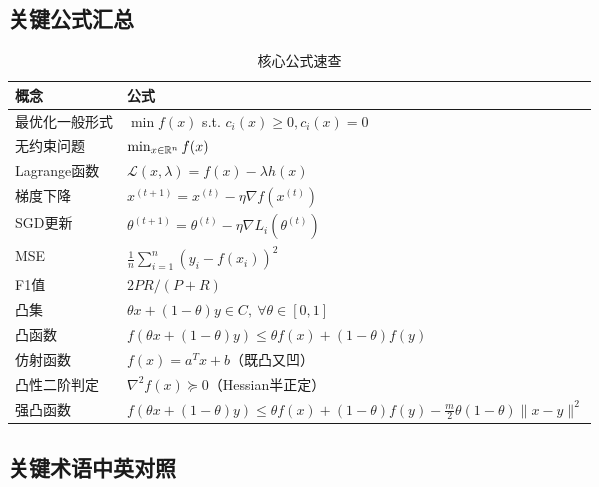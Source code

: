 \subsection{关键公式汇总}

\begin{table}[htbp]
\centering
\caption{核心公式速查}
\begin{tabular}{@{}ll@{}}
\toprule
\textbf{概念} & \textbf{公式} \\
\midrule
最优化一般形式 & $\min f(x)$ s.t. $c_i(x) \geq 0, c_i(x) = 0$ \\
无约束问题 & $\min_{x \in \mathbb{R}^n} f(x)$ \\
Lagrange函数 & $\mathcal{L}(x, \lambda) = f(x) - \lambda h(x)$ \\
梯度下降 & $x^{(t+1)} = x^{(t)} - \eta \nabla f(x^{(t)})$ \\
SGD更新 & $\theta^{(t+1)} = \theta^{(t)} - \eta \nabla L_i(\theta^{(t)})$ \\
MSE & $\frac{1}{n}\sum_{i=1}^{n}(y_i - f(x_i))^2$ \\
F1值 & $2PR/(P+R)$ \\
凸集 & $\theta x + (1-\theta)y \in C,\ \forall \theta \in [0,1]$ \\
凸函数 & $f(\theta x + (1-\theta)y) \leq \theta f(x) + (1-\theta)f(y)$ \\
仿射函数 & $f(x) = a^T x + b$（既凸又凹） \\
凸性二阶判定 & $\nabla^2 f(x) \succeq 0$（Hessian半正定） \\
强凸函数 & $f(\theta x + (1-\theta)y) \leq \theta f(x) + (1-\theta)f(y) - \frac{m}{2}\theta(1-\theta)\|x-y\|^2$ \\
\bottomrule
\end{tabular}
\end{table}

\subsection{关键术语中英对照}

